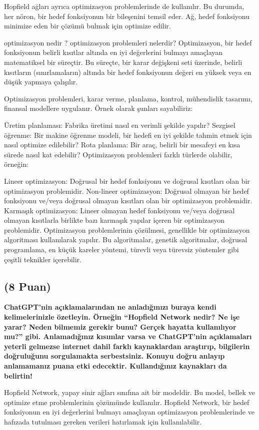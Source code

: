 \documentclass[11pt]{article}
\begin{document}
Hopfield ağları ayrıca optimizasyon problemlerinde de kullanılır. Bu durumda, her nöron, bir hedef fonksiyonun bir bileşenini temsil eder. Ağ, hedef fonksiyonu minimize eden bir çözümü bulmak için optimize edilir.

optimizasyon nedir ? optimizasyon problemleri nelerdir?
Optimizasyon, bir hedef fonksiyonun belirli kısıtlar altında en iyi değerlerini bulmayı amaçlayan matematiksel bir süreçtir. Bu süreçte, bir karar değişkeni seti üzerinde, belirli kısıtların (sınırlamaların) altında bir hedef fonksiyonun değeri en yüksek veya en düşük yapmaya çalışılır.

Optimizasyon problemleri, karar verme, planlama, kontrol, mühendislik tasarımı, finansal modellere uygulanır. Örnek olarak şunları sayabiliriz:

Üretim planlaması: Fabrika üretimi nasıl en verimli şekilde yapılır?
Sezgisel öğrenme: Bir makine öğrenme modeli, bir hedefi en iyi şekilde tahmin etmek için nasıl optimize edilebilir?
Rota planlama: Bir araç, belirli bir mesafeyi en kısa sürede nasıl kat edebilir?
Optimizasyon problemleri farklı türlerde olabilir, örneğin:

Lineer optimizasyon: Doğrusal bir hedef fonksiyonu ve doğrusal kısıtları olan bir optimizasyon problemidir.
Non-lineer optimizasyon: Doğrusal olmayan bir hedef fonksiyonu ve/veya doğrusal olmayan kısıtları olan bir optimizasyon problemidir.
Karmaşık optimizasyon: Lineer olmayan hedef fonksiyonu ve/veya doğrusal olmayan kısıtlarla birlikte bazı karmaşık yapılar içeren bir optimizasyon problemidir.
Optimizasyon problemlerinin çözülmesi, genellikle bir optimizasyon algoritması kullanılarak yapılır. Bu algoritmalar, genetik algoritmalar, doğrusal programlama, en küçük kareler yöntemi, türevli veya türevsiz yöntemler gibi çeşitli teknikler içerebilir.


\subsection{(8 Puan)} \textbf{ChatGPT’nin açıklamalarından ne anladığınızı buraya kendi kelimelerinizle özetleyin. Örneğin ``Hopfield Network nedir? Ne işe yarar? Neden bilmemiz gerekir bunu? Gerçek hayatta kullanılıyor mu?'' gibi. Anlamadığınız kısımlar varsa ve ChatGPT’nin açıklamaları yeterli gelmezse internet dahil farklı kaynaklardan araştırıp, bilgilerin doğruluğunu sorgulamakta serbestsiniz. Konuyu doğru anlayıp anlamamanız puana etki edecektir. Kullandığınız kaynakları da belirtin!}

Hopfield Network, yapay sinir ağları sınıfına ait bir modeldir. Bu model, bellek ve optimize etme problemlerinin çözümünde kullanılır. Hopfield Network, bir hedef fonksiyonun en iyi değerlerini bulmayı amaçlayan optimizasyon problemlerinde ve hafızada tutulması gereken verileri hatırlamak için  kullanılabilir.
\end{document}
